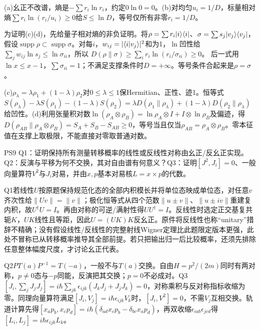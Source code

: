 \begin{solution}
(a)幺正不改谱，熵是$-\sum r_i\ln r_i$，约定$0\ln0=0$。(b)对均匀$u_i=1/D$，标量相对熵$\sum r_i\ln(r_i/u_i)\ge0$给$S\le\ln D$，等号仅所有非零$r_i=1/D$。

为证明(c)(d)，先给量子相对熵的非负证明。将$\rho=\sum r_i\lvert i\rangle\langle i\rvert$、$\sigma=\sum s_j\lvert v_j\rangle\langle v_j\rvert$，假设$\operatorname{supp}\rho\subset\operatorname{supp}\sigma$。对每$i$，$w_{ij}=|\langle i\vert v_j\rangle|^2$和为1，$\ln$凹性给$\sum_jw_{ij}\ln s_j\le\ln\sigma_{ii}$，所以
$D(\rho\|\sigma)\ge\sum_i r_i\ln(r_i/\sigma_{ii})\ge0$。
后一式用$\ln x\le x-1$，$\sum\sigma_{ii}=1$；不满足支撑条件时$D=+\infty$。等号条件合起来是$\rho=\sigma$。

(c)$\rho_\lambda=\lambda\rho_1+(1-\lambda)\rho_2$对$0\le\lambda\le1$保Hermitian、正性、迹1。恒等式$S(\rho_\lambda)-\lambda S(\rho_1)-(1-\lambda)S(\rho_2)=\lambda D(\rho_1\|\rho_\lambda)+(1-\lambda)D(\rho_2\|\rho_\lambda)$给凹性。(d)利用张量积对数$\ln(\rho_A\otimes\rho_B)=\ln\rho_A\otimes I+I\otimes\ln\rho_B$及偏迹，得$D(\rho_{AB}\|\rho_A\otimes\rho_B)=S_A+S_B-S_{AB}\ge0$，等号当且仅当$\rho_{AB}=\rho_A\otimes\rho_B$。零本征值在支撑上取极限，不能直接对零取普通对数。
\end{solution}

\begin{exercise}
PS9 Q1：证明保持所有测量转移概率的线性或反线性对称由幺正/反幺正实现。Q2：反演与平移为何不交换，其对自由谱有何意义？Q3：证明$[J^2,J_i]=0$、一般向量算符$V^2$与$J_i$对易，并由$x,p$基本对易核$L=x\times p$的代数。
\end{exercise}
\begin{solution}
Q1若线性$U$按原题保持规范化态的全部内积模长并将单位态映成单位态，对任意$v$齐次性给$\|Uv\|=\|v\|$；极化恒等式从四个范数$\|u\pm v\|$、$\|u\pm iv\|$重建复内积，故$U^\dagger U=I$。再由对称的可逆/满射性得$UU^\dagger=I$。反线性时选定正交基复共轭$K$，$UK$线性且等距，因此$U=(UK)K$反幺正。原件将反线性也称“unitary”措辞不精确；没有假设线性/反线性的完整射线Wigner定理比此题限定版本更强，此处不冒称已从转移概率推导其全部前提。若只把输出归一后比较概率，还须先排除任意整体幅度尺度，才讨论幺正代表。

Q2$PT(a)P^{-1}=T(-a)$，一般不与$T(a)$交换。自由$H=p^2/(2m)$同时有两对称，$p\ne0$态与$-p$同能，反演把其交换；$p=0$不必成对。Q3$[J_i,\sum_jJ_jJ_j]=i\hbar\sum_{jk}\epsilon_{ijk}(J_kJ_j+J_jJ_k)=0$，对称乘积与反对称指标收缩为零。同理向量算符满足$[J_i,V_j]=i\hbar\epsilon_{ijk}V_k$时，$[J_i,V^2]=0$，不需$V_j$互相交换。轨道计算先得$[x_ap_b,x_cp_d]=i\hbar(\delta_{ad}x_cp_b-\delta_{bc}x_ap_d)$，再双收缩$\epsilon_{iab}\epsilon_{jcd}$得$[L_i,L_j]=i\hbar\epsilon_{ijk}L_k$。
\end{solution}

